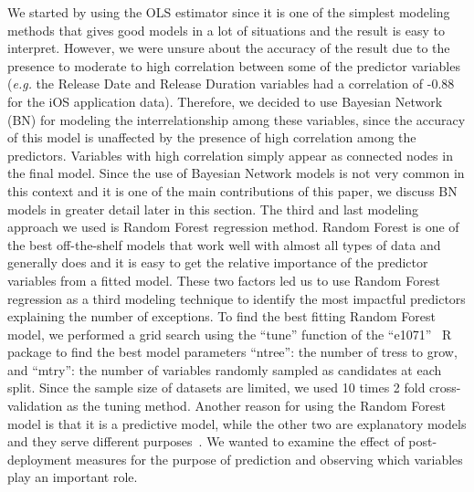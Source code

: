 \documentclass[smallcondensed]{svjour3}     %
\begin{document}
We started by using the OLS estimator since it is one of the simplest modeling methods that gives good models in a lot of situations and the result is easy to interpret. However, we were unsure about the accuracy of the result due to the presence to moderate to high correlation between some of the predictor variables (\emph{e.g.} the Release Date and Release Duration variables had a correlation of -0.88 for the iOS application data). 
Therefore, we decided to use Bayesian Network (BN) for modeling the interrelationship among these variables, since the accuracy of this model is unaffected by the presence of high correlation among the predictors. Variables with high correlation simply appear as connected nodes in the final model. Since the use of Bayesian Network models is not very common in this context and it is one of the main contributions of this paper, we discuss BN models in greater detail later in this section. The third and last modeling approach we used is Random Forest regression method. Random Forest is one of the best off-the-shelf models that work well with almost all types of data and generally does  and it is easy to get the relative importance of the predictor variables from a fitted model. These two factors led us to use Random Forest regression as a third modeling technique to identify the most impactful predictors explaining the number of exceptions. To find the best fitting Random Forest model, we performed a grid search using the ``tune'' function of the ``e1071''~\cite{e1071} R package to find the best model parameters ``ntree'': the number of tress to grow, and ``mtry'': the number of variables randomly sampled as candidates at each split. Since the sample size of datasets are limited, we used 10 times 2 fold cross-validation as the tuning method. Another reason for using  the Random Forest model is that it is a predictive model, while the other two are explanatory models and they serve different purposes~\cite{shmueli2010explain}. We wanted to examine the effect of post-deployment measures for the purpose of prediction and observing which variables play an important role. 

\vspace{-10pt}
\end{document}
